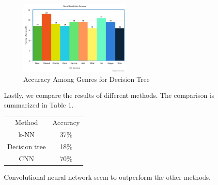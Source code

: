 \documentclass[acmtog, authorversion]{acmart}
\begin{document}
\begin{figure}[h!]
  \centering
  \includegraphics[width=0.5\textwidth]{meta-chart.jpeg}
  \caption{Accuracy Among Genres for Decision Tree}
  \end{figure}


Lastly, we compare the results of different methods. The comparison is summarized in Table 1.
\begin{center}
   \label{tab:title} 
  \begin{tabular}{ |c|c| } 
   \hline
   Method & Accuracy  \\ 
   k-NN & 37\% \\ 
   Decision tree & 18\%  \\ 
   CNN & 70\% \\
   \hline
  \end{tabular}
  \end{center}
Convolutional neural network seem to outperform the other methods.
\end{document}
